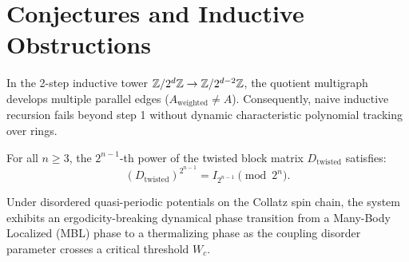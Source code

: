 \section{Conjectures and Inductive Obstructions}

\begin{theorem}
\label{thm:inductive_tower_obstruction}
\leanok
In the 2-step inductive tower $\mathbb{Z}/2^d\mathbb{Z} \to \mathbb{Z}/2^{d-2}\mathbb{Z}$, the quotient multigraph develops multiple parallel edges ($A_{\mathrm{weighted}} \neq A$). Consequently, naive inductive recursion fails beyond step 1 without dynamic characteristic polynomial tracking over rings.
\end{theorem}

\begin{conjecture}
\label{conj:twisted_block_pow}
For all $n \ge 3$, the $2^{n-1}$-th power of the twisted block matrix $D_{\mathrm{twisted}}$ satisfies:
\[
(D_{\mathrm{twisted}})^{2^{n-1}} = I_{2^{n-1}} \pmod{2^n}.
\]
\end{conjecture}

\begin{conjecture}
\label{conj:mbl_phase_transition}
Under disordered quasi-periodic potentials on the Collatz spin chain, the system exhibits an ergodicity-breaking dynamical phase transition from a Many-Body Localized (MBL) phase to a thermalizing phase as the coupling disorder parameter crosses a critical threshold $W_c$.
\end{conjecture}

